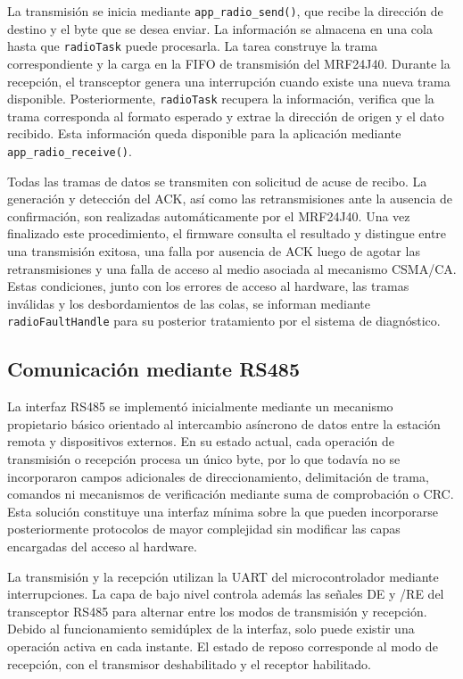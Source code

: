 La transmisión se inicia mediante \texttt{app\_radio\_send()}, que recibe la dirección de destino y el byte que se desea enviar. La información se almacena en una cola hasta que \texttt{radioTask} puede procesarla. La tarea construye la trama correspondiente y la carga en la FIFO de transmisión del MRF24J40. Durante la recepción, el transceptor genera una interrupción cuando existe una nueva trama disponible. Posteriormente, \texttt{radioTask} recupera la información, verifica que la trama corresponda al formato esperado y extrae la dirección de origen y el dato recibido. Esta información queda disponible para la aplicación mediante \texttt{app\_radio\_receive()}.

Todas las tramas de datos se transmiten con solicitud de acuse de recibo. La generación y detección del ACK, así como las retransmisiones ante la ausencia de confirmación, son realizadas automáticamente por el MRF24J40. Una vez finalizado este procedimiento, el firmware consulta el resultado y distingue entre una transmisión exitosa, una falla por ausencia de ACK luego de agotar las retransmisiones y una falla de acceso al medio asociada al mecanismo CSMA/CA. Estas condiciones, junto con los errores de acceso al hardware, las tramas inválidas y los desbordamientos de las colas, se informan mediante \texttt{radioFaultHandle} para su posterior tratamiento por el sistema de diagnóstico.


\subsection{Comunicación mediante RS485}

La interfaz RS485 se implementó inicialmente mediante un mecanismo propietario básico orientado al intercambio asíncrono de datos entre la estación remota y dispositivos externos. En su estado actual, cada operación de transmisión o recepción procesa un único byte, por lo que todavía no se incorporaron campos adicionales de direccionamiento, delimitación de trama, comandos ni mecanismos de verificación mediante suma de comprobación o CRC. Esta solución constituye una interfaz mínima sobre la que pueden incorporarse posteriormente protocolos de mayor complejidad sin modificar las capas encargadas del acceso al hardware.

La transmisión y la recepción utilizan la UART del microcontrolador mediante interrupciones. La capa de bajo nivel controla además las señales DE y /RE del transceptor RS485 para alternar entre los modos de transmisión y recepción. Debido al funcionamiento semidúplex de la interfaz, solo puede existir una operación activa en cada instante. El estado de reposo corresponde al modo de recepción, con el transmisor deshabilitado y el receptor habilitado.

